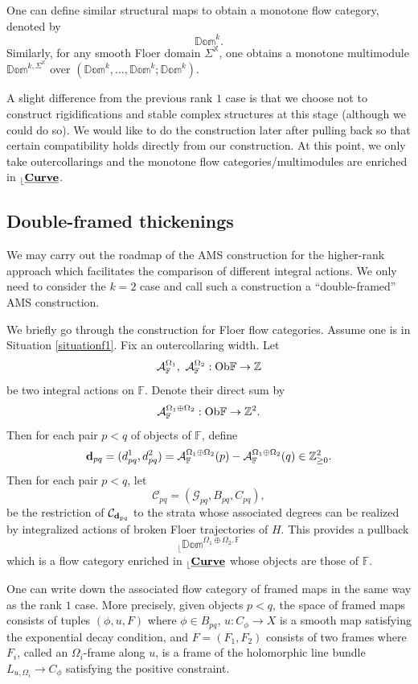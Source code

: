 \documentclass[reqno, 10pt]{amsart}
\numberwithin{equation}{section}
\numberwithin{equation}{section}
\theoremstyle{definition}
\theoremstyle{remark}
\newcommand{\beqn}{\begin{equation*}}
\newcommand{\eeqn}{\end{equation*}}
\newcommand{\mb}{\mathbb}
\newcommand{\mc}{\mathcal}
\renewcommand{\outer}{{}_{\lfloor}}
\newcommand{\uds}[1]{\underline{\smash{#1}}}
\begin{document}
One can define similar structural maps to obtain a monotone flow category, denoted by 
\beqn
\mb{Dom}^k.
\eeqn
Similarly, for any smooth Floer domain $\Sigma^{\mb X}$, one obtains a monotone multimodule $\mb{Dom}^{k, \Sigma^{\mb X}}$ over $(\mb{Dom}^k, \ldots, \mb{Dom}^k; \mb{Dom}^k)$.


A slight difference from the previous rank $1$ case is that we choose not to construct rigidifications and stable complex structures at this stage (although we could do so). We would like to do the construction later after pulling back so that certain compatibility holds directly from our construction. At this point, we only take outercollarings and the monotone flow categories/multimodules are enriched in $\outer \uds{\bf Curve}$.


\subsection{Double-framed thickenings}

We may carry out the roadmap of the AMS construction for the higher-rank approach which facilitates the comparison of different integral actions. We only need to consider the $k=2$ case and call such a construction a ``double-framed'' AMS construction.

We briefly go through the construction for Floer flow categories. Assume one is in Situation \ref{situationf1}. Fix an outercollaring width. Let 
\beqn
{\mc A}_{\mb{F}}^{\Omega_1},\ {\mc A}_{\mb{F}}^{\Omega_2}: {\rm Ob}{\mb F} \to {\mb Z}
\eeqn
be two integral actions on ${\mb F}$. Denote their direct sum by
\beqn
{\mc A}_{\mb F}^{\Omega_1 \oplus \Omega_2}: {\rm Ob}{\mb F} \to {\mb Z}^2.
\eeqn
Then for each pair $p<q$ of objects of ${\mb F}$, define
\beqn
{\bf d}_{pq} = (d_{pq}^1, d_{pq}^2) = {\mc A}_{\mb F}^{\Omega_1 \oplus \Omega_2}(p) - {\mc A}_{\mb F}^{\Omega_1 \oplus \Omega_2} (q)\in {\mb Z}_{\geq 0}^2.
\eeqn
Then for each pair $p<q$, let
\beqn
{\mc C}_{pq}  = ({\mc G}_{pq}, B_{pq}, C_{pq}), 
\eeqn
be the restriction of ${\mc C}_{{\bf d}_{pq}}$ to the strata whose associated degrees can be realized by integralized actions of broken Floer trajectories of $H$. This provides a pullback 
\beqn
\outer \mb{Dom}^{\Omega_1 \oplus \Omega_2, {\mb F}}
\eeqn
which is a flow category enriched in $\outer \uds{\bf Curve}$ whose objects are those of ${\mb F}$. 


One can write down the associated flow category of framed maps in the same way as the rank $1$ case. More precisely, given objects $p<q$, the space of framed maps consists of tuples $(\phi, u, F)$ where $\phi \in B_{pq}$, $u: C_\phi \to X$ is a smooth map satisfying the exponential decay condition, and $F = (F_1, F_2)$ consists of two frames where $F_i$, called an $\Omega_i$-frame along $u$, is a frame of the holomorphic line bundle $L_{u, \Omega_i} \to C_\phi$ satisfying the positive constraint.
\end{document}
